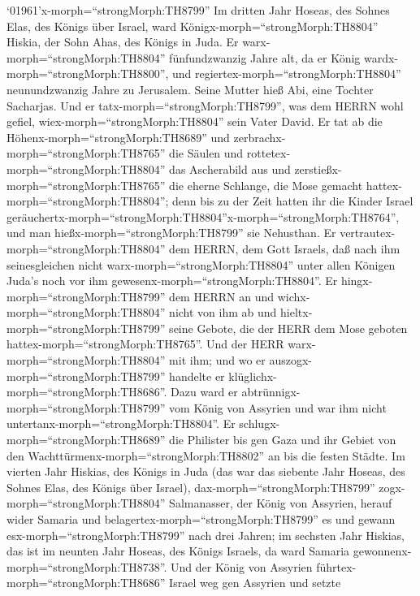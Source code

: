  `01961'\textbar x-morph=``strongMorph:TH8799'' Im dritten
Jahr Hoseas, des Sohnes Elas, des Königs über Israel, ward
Königx-morph=``strongMorph:TH8804'' Hiskia, der Sohn Ahas, des Königs in
Juda.  Er warx-morph=``strongMorph:TH8804'' fünfundzwanzig
Jahre alt, da er König wardx-morph=``strongMorph:TH8800'', und
regiertex-morph=``strongMorph:TH8804'' neunundzwanzig Jahre zu
Jerusalem. Seine Mutter hieß Abi, eine Tochter Sacharjas. 
Und er tatx-morph=``strongMorph:TH8799'', was dem HERRN wohl gefiel,
wiex-morph=``strongMorph:TH8804'' sein Vater David.  Er tat
ab die Höhenx-morph=``strongMorph:TH8689'' und
zerbrachx-morph=``strongMorph:TH8765'' die Säulen und
rottetex-morph=``strongMorph:TH8804'' das Ascherabild aus und
zerstießx-morph=``strongMorph:TH8765'' die eherne Schlange, die Mose
gemacht hattex-morph=``strongMorph:TH8804''; denn bis zu der Zeit hatten
ihr die Kinder Israel
geräuchertx-morph=``strongMorph:TH8804''x-morph=``strongMorph:TH8764'',
und man hießx-morph=``strongMorph:TH8799'' sie Nehusthan. 
Er vertrautex-morph=``strongMorph:TH8804'' dem HERRN, dem Gott Israels,
daß nach ihm seinesgleichen nicht warx-morph=``strongMorph:TH8804''
unter allen Königen Juda's noch vor ihm
gewesenx-morph=``strongMorph:TH8804''.  Er
hingx-morph=``strongMorph:TH8799'' dem HERRN an und
wichx-morph=``strongMorph:TH8804'' nicht von ihm ab und
hieltx-morph=``strongMorph:TH8799'' seine Gebote, die der HERR dem Mose
geboten hattex-morph=``strongMorph:TH8765''.  Und der HERR
warx-morph=``strongMorph:TH8804'' mit ihm; und wo er
auszogx-morph=``strongMorph:TH8799'' handelte er
klüglichx-morph=``strongMorph:TH8686''. Dazu ward er
abtrünnigx-morph=``strongMorph:TH8799'' vom König von Assyrien und war
ihm nicht untertanx-morph=``strongMorph:TH8804''.  Er
schlugx-morph=``strongMorph:TH8689'' die Philister bis gen Gaza und ihr
Gebiet von den Wachttürmenx-morph=``strongMorph:TH8802'' an bis die
festen Städte.  Im vierten Jahr Hiskias, des Königs in Juda
(das war das siebente Jahr Hoseas, des Sohnes Elas, des Königs über
Israel), dax-morph=``strongMorph:TH8799''
zogx-morph=``strongMorph:TH8804'' Salmanasser, der König von Assyrien,
herauf wider Samaria und belagertex-morph=``strongMorph:TH8799'' es
 und gewann esx-morph=``strongMorph:TH8799'' nach drei
Jahren; im sechsten Jahr Hiskias, das ist im neunten Jahr Hoseas, des
Königs Israels, da ward Samaria gewonnenx-morph=``strongMorph:TH8738''.
 Und der König von Assyrien
führtex-morph=``strongMorph:TH8686'' Israel weg gen Assyrien und setzte
